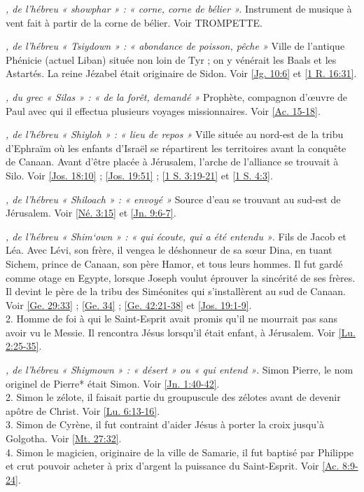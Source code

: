 \begin{multicols}{2}
\textit{, de l'hébreu « showphar » : « corne, corne de bélier ».}\newline
Instrument de musique à vent fait à partir de la corne de bélier. Voir TROMPETTE.

\textit{, de l'hébreu « Tsiydown » : « abondance de poisson, pêche »}\newline
Ville de l'antique Phénicie (actuel Liban) située non loin de Tyr ; on y vénérait les Baals et les Astartés. La reine Jézabel était originaire de Sidon. Voir \vref{Jg. 10:6} et \vref{1 R. 16:31}.

\textit{, du grec « Silas » : « de la forêt, demandé »}\newline
Prophète, compagnon d'œuvre de Paul avec qui il effectua plusieurs voyages missionnaires. Voir \vref{Ac. 15-18}.

\textit{, de l'hébreu « Shiyloh » : « lieu de repos »}\newline
Ville située au nord-est de la tribu d'Ephraïm où les enfants d'Israël se répartirent les territoires avant la conquête de Canaan. Avant d'être placée à Jérusalem, l'arche de l'alliance se trouvait à Silo. Voir \vref{Jos. 18:10} ; \vref{Jos. 19:51} ; \vref{1 S. 3:19-21} et \vref{1 S. 4:3}.

\textit{, de l'hébreu « Shiloach » : « envoyé »}\newline
Source d'eau se trouvant au sud-est de Jérusalem. Voir \vref{Né. 3:15} et \vref{Jn. 9:6-7}.

\textit{, de l'hébreu « Shim`own » : « qui écoute, qui a été entendu »}. Fils de Jacob et Léa. Avec Lévi, son frère, il vengea le déshonneur de sa sœur Dina, en tuant Sichem, prince de Canaan, son père Hamor, et tous leurs hommes. Il fut gardé comme otage en Egypte, lorsque Joseph voulut éprouver la sincérité de ses frères. Il devint le père de la tribu des Siméonites qui s'installèrent au sud de Canaan. Voir \vref{Ge. 29:33} ; \vref{Ge. 34} ; \vref{Ge. 42:21-38} et \vref{Jos. 19:1-9}.
\\2. Homme de foi à qui le Saint-Esprit avait promis qu'il ne mourrait pas sans avoir vu le Messie. Il rencontra Jésus lorsqu'il était enfant, à Jérusalem. Voir \vref{Lu. 2:25-35}.

\textit{, de l'hébreu « Shiymown » : « désert » ou « qui entend »}. Simon Pierre, le nom originel de Pierre* était Simon. Voir \vref{Jn. 1:40-42}.
\\2. Simon le zélote, il faisait partie du groupuscule des zélotes avant de devenir apôtre de Christ. Voir \vref{Lu. 6:13-16}.
\\3. Simon de Cyrène, il fut contraint d'aider Jésus à porter la croix jusqu'à Golgotha. Voir \vref{Mt. 27:32}.
\\4. Simon le magicien, originaire de la ville de Samarie, il fut baptisé par Philippe et crut pouvoir acheter à prix d'argent la puissance du Saint-Esprit. Voir \vref{Ac. 8:9-24}.


\end{multicols}
